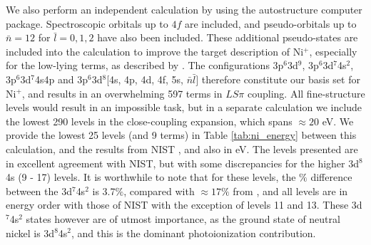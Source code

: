 We also perform an independent calculation by using the {\sc autostructure} computer package. Spectroscopic orbitals up to $4f$ are included, and pseudo-orbitals up to $\bar{n}=12$ for $\bar{l}=0,1,2$ have also been included. These additional pseudo-states are included into the calculation to improve the target description of Ni$^+$, especially for the low-lying terms, as described by \citet{1996JPhB...29..115B}. The configurations 3p$^6$3d$^9$, 3p$^6$3d$^7$4s$^2$, 3p$^6$3d$^7$4s4p and 3p$^6$3d$^8$[4s, 4p, 4d, 4f, 5s, $\bar{n}\bar{l}]$ therefore constitute our basis set for Ni$^+$, and results in an overwhelming 597 terms in $LS\pi$ coupling. All fine-structure levels would result in an impossible task, but in a separate calculation we include the lowest 290 levels in the close-coupling expansion, which spans $\approx 20$ eV. We provide the lowest 25 levels (and 9 terms) in Table \ref{tab:ni_energy} between this calculation, and the results from NIST \citep{1985aeli.book.....S}, and also \citet{2010A&A...513A..55C} in eV. The levels presented are in excellent agreement with NIST, but with some discrepancies for the higher 3d$^8$4s (9 - 17) levels. It is worthwhile to note that for these levels, the $\%$ difference between the 3d$^7$4s$^2$ is 3.7$\%$, compared with $\approx 17\%$ from \citet{2010A&A...513A..55C}, and all levels are in energy order with those of NIST with the exception of levels 11 and 13. These 3d$^7$4s$^2$ states however are of utmost importance, as the ground state of neutral nickel is 3d$^8$4s$^2$, and this is the dominant photoionization contribution.

